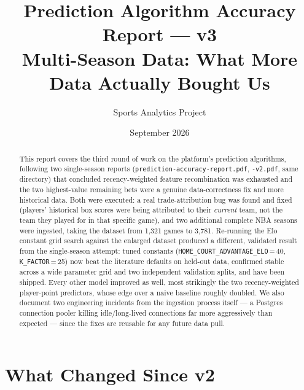 \documentclass[11pt]{article}
\title{\textbf{Prediction Algorithm Accuracy Report — v3} \\ \large Multi-Season Data: What More Data Actually Bought Us}
\author{Sports Analytics Project}
\date{September 2026}
\newcommand{\code}[1]{\allowbreak\texttt{\small #1}\allowbreak}
\begin{document}
\maketitle

\begin{abstract}
\noindent This report covers the third round of work on the platform's prediction algorithms, following two
single-season reports (\code{prediction-accuracy-report.pdf}, \code{-v2.pdf}, same directory) that concluded
recency-weighted feature recombination was exhausted and the two highest-value remaining bets were a genuine
data-correctness fix and more historical data. Both were executed: a real trade-attribution bug was found and
fixed (players' historical box scores were being attributed to their \emph{current} team, not the team they
played for in that specific game), and two additional complete NBA seasons were ingested, taking the dataset
from 1,321 games to 3,781. Re-running the Elo constant grid search against the enlarged dataset produced a
different, validated result from the single-season attempt: tuned constants
(\code{HOME\_COURT\_ADVANTAGE\_ELO}\,=\,40, \code{K\_FACTOR}\,=\,25) now beat the literature defaults on
held-out data, confirmed stable across a wide parameter grid and two independent validation splits, and have
been shipped. Every other model improved as well, most strikingly the two recency-weighted player-point
predictors, whose edge over a naive baseline roughly doubled. We also document two engineering incidents from
the ingestion process itself — a Postgres connection pooler killing idle/long-lived connections far more
aggressively than expected — since the fixes are reusable for any future data pull.
\end{abstract}

\tableofcontents

\section{What Changed Since v2}
\end{document}
